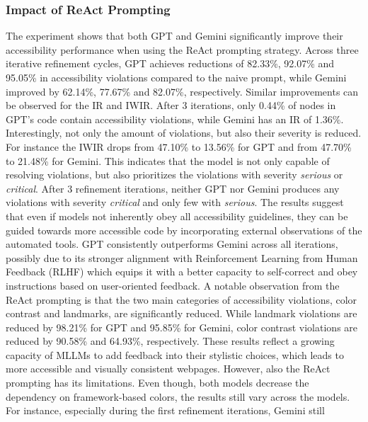 \subsubsection{Impact of ReAct Prompting}
The experiment shows that both GPT and Gemini significantly 
improve their accessibility performance when using the ReAct 
prompting strategy. Across three iterative refinement 
cycles, GPT achieves reductions of 82.33\%, 92.07\% and 95.05\% 
in accessibility violations compared to the naive prompt, while 
Gemini improved by 62.14\%, 77.67\% and 82.07\%, respectively.
Similar improvements can be observed for the IR and IWIR. 
After 3 iterations, only 0.44\% of nodes in GPT's code
contain accessibility violations, while Gemini has an IR of 1.36\%.
Interestingly, not only the amount of violations, but also 
their severity is reduced. For instance the IWIR drops from 
47.10\% to 13.56\% for GPT and from 47.70\% to 21.48\% for Gemini.
This indicates that the model is not only capable of 
resolving violations, but also prioritizes the violations 
with severity \emph{serious} or \emph{critical}. After 3 
refinement iterations, neither GPT nor Gemini produces 
any violations with severity \emph{critical} and only 
few with \emph{serious}.\newline 
The results suggest that even if models not inherently 
obey all accessibility guidelines, they can be
guided towards more accessible code by incorporating 
external observations of the automated tools. GPT 
consistently outperforms Gemini across all iterations,
possibly due to its stronger alignment with 
Reinforcement Learning from Human Feedback (RLHF) which 
equips it with a better capacity to self-correct and 
obey instructions based on user-oriented feedback.\newline 
A notable observation from the ReAct prompting is that the 
two main categories of accessibility violations, 
color contrast and landmarks, are significantly reduced.
While landmark violations are reduced by 98.21\% for GPT and
95.85\% for Gemini, color contrast violations are reduced by
90.58\% and 64.93\%, respectively. 
These results reflect a growing capacity of MLLMs 
to add feedback into their stylistic choices, which 
leads to more accessible and visually consistent webpages.\newline 
However, also the ReAct prompting has its limitations.
Even though, both 
models decrease the dependency on framework-based 
colors, the results still 
vary across the models. For instance, especially 
during the first refinement iterations, Gemini still 
